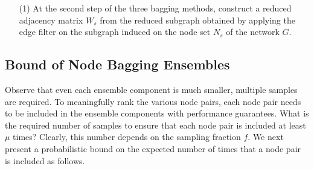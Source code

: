 


\vspace{-1ex}
\begin{enumerate}
\item[(1)]
At the second step of the three bagging methods, construct a reduced adjacency matrix $W_s$
from the reduced subgraph obtained by applying the edge filter
on the subgraph induced on the node set $N_s$ of the network $G$.

\end{enumerate}
\vspace{-1ex}


\subsection{Bound of Node Bagging Ensembles}

Observe that even each ensemble component is much smaller,
multiple samples are required. To meaningfully rank the various node
pairs, each node pair needs to be included in the ensemble components with performance guarantees.
What is the required number of samples to
ensure that each node pair is included  at least $\mu$ times? Clearly,
this number depends on the sampling fraction $f$. We next present a
probabilistic bound on the expected number of times that a node pair is included as follows.

